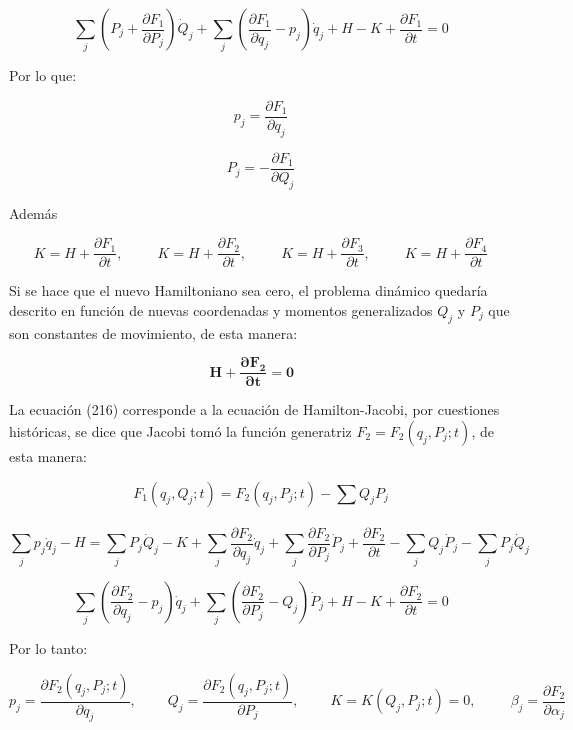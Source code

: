 \documentclass[]{article}
\begin{document}
\[\sum_{j}^{}\left( P_{j} + \frac{\partial F_{1}}{\partial P_{j}} \right){\dot{Q}}_{j} + \sum_{j}^{}\left( \frac{\partial F_{1}}{\partial q_{j}} - p_{j} \right){\dot{q}}_{j} + H - K + \frac{\partial F_{1}}{\partial t} = 0\]

Por lo que:

\[p_{j} = \frac{\partial F_{1}}{\partial q_{j}}\]

\[P_{j} = - \frac{\partial F_{1}}{\partial Q_{j}}\]

Además

\[K = H + \frac{\partial F_{1}}{\partial t},\ \ \ \ \ \ \ \ \ \ \ K = H + \frac{\partial F_{2}}{\partial t},\ \ \ \ \ \ \ \ \ \ \ K = H + \frac{\partial F_{3}}{\partial t},\ \ \ \ \ \ \ \ \ \ \ K = H + \frac{\partial F_{4}}{\partial t}\]

Si se hace que el nuevo Hamiltoniano sea cero, el problema dinámico
quedaría descrito en función de nuevas coordenadas y momentos
generalizados \(Q_{j}\) y \(P_{j}\) que son constantes de movimiento, de
esta manera:

\[\mathbf{H +}\frac{\mathbf{\partial}\mathbf{F}_{\mathbf{2}}}{\mathbf{\partial t}}\mathbf{= 0\ \ \ \ \ \ }\]

La ecuación (216) corresponde a la ecuación de Hamilton-Jacobi, por
cuestiones históricas, se dice que Jacobi tomó la función generatriz
\(F_{2} = F_{2}\left( q_{j},P_{j};t \right)\), de esta manera:

\[F_{1}\left( q_{j},Q_{j};t \right) = F_{2}\left( q_{j},P_{j};t \right) - \sum_{}^{}{Q_{j}P_{j}}\]

\[\sum_{j}^{}{p_{j}{\dot{q}}_{j}} - H = \sum_{j}^{}{P_{j}{\dot{Q}}_{j}} - K + \sum_{j}^{}\frac{\partial F_{2}}{\partial q_{j}}{\dot{q}}_{j} + \sum_{j}^{}\frac{\partial F_{2}}{\partial P_{j}}{\dot{P}}_{j} + \frac{\partial F_{2}}{\partial t} - \sum_{j}^{}{Q_{j}{\dot{P}}_{j}} - \sum_{j}^{}{P_{j}{\dot{Q}}_{j}}\]

\[\sum_{j}^{}\left( \frac{\partial F_{2}}{\partial q_{j}} - p_{j} \right){\dot{q}}_{j} + \sum_{j}^{}\left( \frac{\partial F_{2}}{\partial P_{j}} - Q_{j} \right){\dot{P}}_{j} + H - K + \frac{\partial F_{2}}{\partial t} = 0\]

Por lo tanto:

\[p_{j} = \frac{\partial F_{2}\left( q_{j},P_{j};t \right)}{\partial q_{j}},\ \ \ \ \ \ \ \ \ \ Q_{j} = \frac{\partial F_{2}\left( q_{j},P_{j};t \right)}{\partial P_{j}},\ \ \ \ \ \ \ \ \ \ K = K\left( Q_{j},P_{j};t \right) = 0,\ \ \ \ \ \ \ \ \ \ \ \beta_{j} = \frac{\partial F_{2}}{\partial\alpha_{j}}\]
\end{document}
